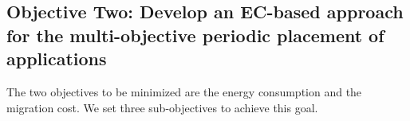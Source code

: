 \subsection{Objective Two: Develop an EC-based approach for the multi-objective periodic placement of applications}
 The two objectives to be minimized are the energy consumption and the migration cost.
We set three sub-objectives to achieve this goal. 

